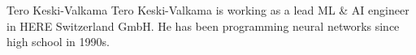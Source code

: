 \documentclass[journal]{IEEEtran}
\begin{document}
\appendices




\begin{IEEEbiography}{Tero Keski-Valkama}
Tero Keski-Valkama is working as a lead ML \& AI engineer in HERE Switzerland GmbH. He has been programming neural networks since high school in 1990s.
\end{IEEEbiography}
\end{document}

